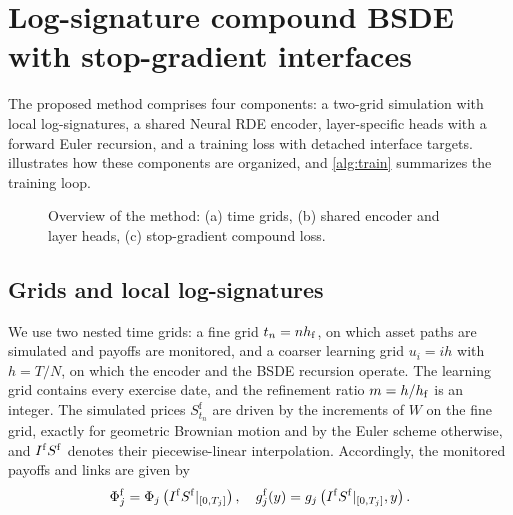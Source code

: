 \section{Log-signature compound BSDE with stop-gradient interfaces}\label{sec:method}

The proposed method comprises four components: a two-grid simulation with local log-signatures, a shared Neural RDE encoder, layer-specific heads with a forward Euler recursion, and a training loss with detached interface targets.  illustrates how these components are organized, and \cref{alg:train} summarizes the training loop.

\begin{figure}[htbp]
\centering
\resizebox{\textwidth}{!}{}
\caption{Overview of the method: (a) time grids, (b) shared encoder and layer heads, (c) stop-gradient compound loss.}
\label{fig:framework}
\end{figure}

\subsection{Grids and local log-signatures}\label{sec:grids}

We use two nested time grids: a fine grid $t_n=nh_{\mathrm f}$, on which asset paths are simulated and payoffs are monitored, and a coarser learning grid $u_i=ih$ with $h=T/N$, on which the encoder and the BSDE recursion operate. The learning grid contains every exercise date, and the refinement ratio $m=h/h_{\mathrm f}$ is an integer. The simulated prices $S^{\mathrm f}_{t_n}$ are driven by the increments of $W$ on the fine grid, exactly for geometric Brownian motion and by the Euler scheme otherwise, and $I^{\mathrm f} S^{\mathrm f}$ denotes their piecewise-linear interpolation. Accordingly, the monitored payoffs and links are given by
\[
\Phi^{\mathrm f}_j=\Phi_j\left(I^{\mathrm f} S^{\mathrm f}|_{[0,T_j]}\right),\quad g^{\mathrm f}_j(y)=g_j\left(I^{\mathrm f} S^{\mathrm f}|_{[0,T_j]},y\right).
\]

